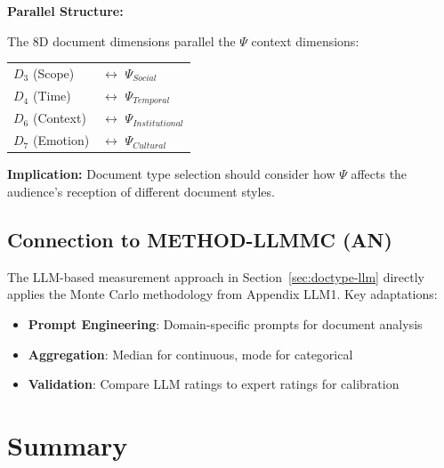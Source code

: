 \begin{tcolorbox}[colback=yellow!5!white, colframe=yellow!75!black,
    title=Integration: METHOD-DOCTYPE $\leftrightarrow$ CORE-WHEN]

\textbf{Parallel Structure:}

The 8D document dimensions parallel the $\Psi$ context dimensions:

\begin{center}
\begin{tabular}{ll}
$D_3$ (Scope) & $\leftrightarrow$ $\Psi_{Social}$ \\
$D_4$ (Time) & $\leftrightarrow$ $\Psi_{Temporal}$ \\
$D_6$ (Context) & $\leftrightarrow$ $\Psi_{Institutional}$ \\
$D_7$ (Emotion) & $\leftrightarrow$ $\Psi_{Cultural}$ \\
\end{tabular}
\end{center}

\textbf{Implication:} Document type selection should consider how $\Psi$ affects
the audience's reception of different document styles.

\end{tcolorbox}

\subsection{Connection to METHOD-LLMMC (AN)}

The LLM-based measurement approach in Section~\ref{sec:doctype-llm} directly
applies the Monte Carlo methodology from Appendix LLM1. Key adaptations:

\begin{itemize}[nosep]
\item \textbf{Prompt Engineering}: Domain-specific prompts for document analysis
\item \textbf{Aggregation}: Median for continuous, mode for categorical
\item \textbf{Validation}: Compare LLM ratings to expert ratings for calibration
\end{itemize}


\section{Summary}
\label{sec:doctype-summary}

